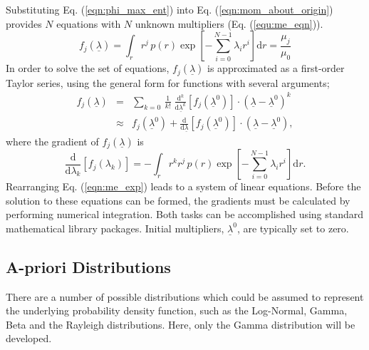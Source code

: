 \documentclass[a4paper,10pt]{article}
\begin{document}
Substituting Eq. (\ref{eqn:phi_max_ent}) into Eq. (\ref{eqn:mom_about_origin}) provides $N$ equations with $N$ unknown multipliers (Eq. (\ref{equ:me_eqn})).
\begin{equation} \label{equ:me_eqn}
f_j (\underline{\lambda}) = \int_{r} r^{j} \, p(r) \exp \left[- \sum^{N-1}_{i = 0} \lambda_{i} r^{i} \right] \mathrm{d}r = \frac{\mu_{j}}{\mu_{0}}
\end{equation}
In order to solve the set of equations, $f_j (\underline{\lambda})$ is approximated as a first-order Taylor series, using the general form for functions with several arguments;
\begin{eqnarray}
f_j (\underline{\lambda}) &=& \sum_{k=0} \, \frac{1}{k!} \; \frac{\mathrm{d}^k}{\mathrm{d}\underline{\lambda}^k} [f_j (\underline{\lambda}^0)] \cdot (\underline{\lambda} - \underline{\lambda}^0)^k \\
&\approx& f_j (\underline{\lambda}^0) + \frac{\mathrm{d}}{\mathrm{d}\underline{\lambda}} [f_j (\underline{\lambda}^0)] \cdot (\underline{\lambda} - \underline{\lambda}^0) \label{eqn:me_exp},
\end{eqnarray}
where the gradient of $f_j (\underline{\lambda})$ is
\begin{equation}
\frac{\mathrm{d}}{\mathrm{d}\lambda_k} [f_j (\lambda_k)] = - \int_{r} r^{k} r^{j} \, p(r) \exp \left[- \sum^{N-1}_{i = 0} \lambda_{i} r^{i} \right] \mathrm{d}r.
\end{equation}
Rearranging Eq. (\ref{eqn:me_exp}) leads to a system of linear equations.  Before the solution to these equations can be formed, the gradients must be calculated by performing numerical integration.  Both tasks can be accomplished using standard mathematical library packages.  Initial multipliers, $\underline{\lambda}^0$, are typically set to zero.


\subsection{A-priori Distributions}
There are a number of possible distributions which could be assumed to represent the underlying probability density function, such as the Log-Normal, Gamma, Beta and the Rayleigh distributions.  Here, only the Gamma distribution will be developed.
\end{document}
